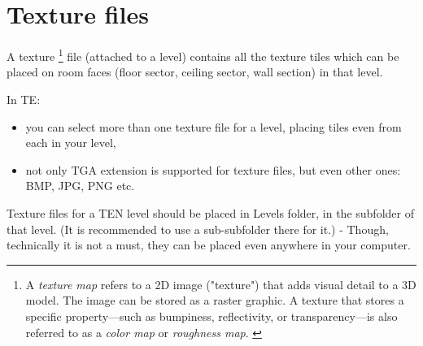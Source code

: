 \section{Texture files}
A texture \footnote{A \emph{texture map}  refers to a 2D image ("texture") that adds visual detail to a 3D model. The image can be stored as a raster graphic. A texture that stores a specific property—such as bumpiness, reflectivity, or transparency—is also referred to as a \emph{color map} or \emph{roughness map}. \cite{texture_mapping_wikipedia}} file (attached to a level) contains all the texture tiles which can be placed on room faces (floor sector, ceiling sector, wall section) in that level.
\par In TE:
\begin{itemize}
    \item you can select more than one texture file for a level, placing tiles even from each in your level,
    \item not only TGA extension is supported for texture files, but even other ones: BMP, JPG, PNG etc.
\end{itemize}
Texture files for a TEN level should be placed in Levels folder, in the subfolder of that level. (It is recommended to use a sub-subfolder there for it.) - Though, technically it is not a must, they can be placed even anywhere in your computer.
